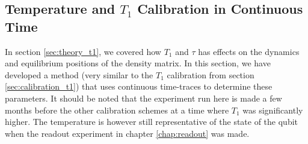 \subsection{Temperature and $T_1$ Calibration in Continuous Time}\label{sec:continuous_calibratino}
In section \ref{sec:theory_t1}, we covered how $T_1$ and $\tau$ has effects on the dynamics and equilibrium positions of the density matrix. In this section, we have developed a method (very similar to the $T_1$ calibration from section \ref{sec:calibration_t1}) that uses continuous time-traces to determine these parameters. It should be noted that the experiment run here is made a few months before the other calibration schemes at a time where $T_1$ was significantly higher. The temperature is however still representative of the state of the qubit when the readout experiment in chapter \ref{chap:readout} was made.



